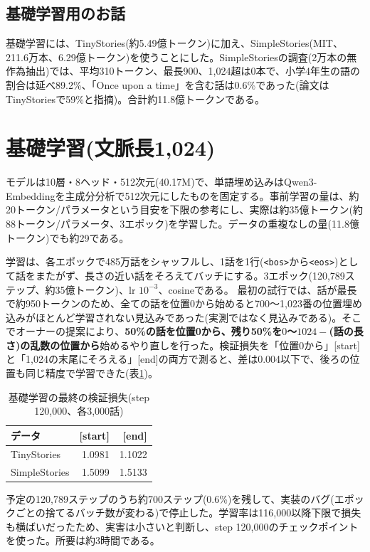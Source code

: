\documentclass[a4paper,11pt]{article}
\begin{document}
\subsection{基礎学習用のお話}
基礎学習には、TinyStories\cite{tinystories}(約5.49億トークン)に加え、SimpleStories\cite{simplestories}(MIT、211.6万本、6.29億トークン)を使うことにした。SimpleStoriesの調査(2万本の無作為抽出)では、平均310トークン、最長900、1,024超は0本で、小学4年生の語の割合は延べ89.2\%、「Once upon a time」を含む話は0.6\%であった(論文はTinyStoriesで59\%と指摘)。合計約11.8億トークンである。

\section{基礎学習(文脈長1,024)}
モデルは10層・8ヘッド・512次元(40.17M)で、単語埋め込みはQwen3-Embedding\cite{qwen3emb}を主成分分析で512次元にしたものを固定する。事前学習の量は、約20トークン/パラメータという目安\cite{chinchilla}を下限の参考にし、実際は約35億トークン(約88トークン/パラメータ、3エポック)を学習した。データの重複なしの量(11.8億トークン)でも約29である。

学習は、各エポックで485万話をシャッフルし、1話を1行(\texttt{<bos>}から\texttt{<eos>})として話をまたがず、長さの近い話をそろえてバッチにする。3エポック(120,789ステップ、約35億トークン)、lr $10^{-3}$、cosineである。
最初の試行では、話が最長で約950トークンのため、全ての話を位置0から始めると700〜1,023番の位置埋め込みがほとんど学習されない見込みであった(実測ではなく見込みである)。そこでオーナーの提案により、\textbf{50\%の話を位置0から、残り50\%を$0$〜$1024-$(話の長さ)の乱数の位置から}始めるやり直しを行った。検証損失を「位置0から」[start]と「1,024の末尾にそろえる」[end]の両方で測ると、差は0.004以下で、後ろの位置も同じ精度で学習できた(表\ref{tab:pre})。

\begin{table}[H]\centering\small
\caption{基礎学習の最終の検証損失(step 120,000、各3,000話)}\label{tab:pre}
\begin{tabular}{lrr}\toprule
データ & [start] & [end]\\\midrule
TinyStories & 1.0981 & 1.1022\\
SimpleStories & 1.5099 & 1.5133\\\bottomrule
\end{tabular}\end{table}

予定の120,789ステップのうち約700ステップ(0.6\%)を残して、実装のバグ(エポックごとの捨てるバッチ数が変わる)で停止した。学習率は116,000以降下限で損失も横ばいだったため、実害は小さいと判断し、step 120,000のチェックポイントを使った。所要は約3時間である。
\end{document}

